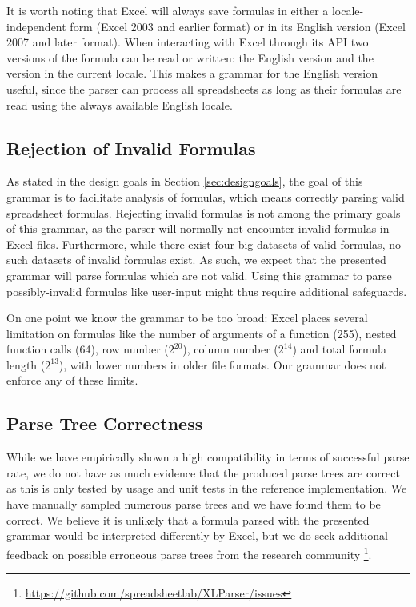 \documentclass[times]{smrauth}
\begin{document}
It is worth noting that Excel will always save formulas in either a locale-independent form (Excel 2003 and earlier format) or in its English version (Excel 2007 and later format). When interacting with Excel through its API two versions of the formula can be read or written: the English version and the version in the current locale.
This makes a grammar for the English version useful, since the parser can process all spreadsheets as long as their formulas are read using the always available English locale.

\subsection{Rejection of Invalid Formulas}

As stated in the design goals in Section \ref{sec:designgoals}, the goal of this grammar is to facilitate analysis of formulas, which means correctly parsing valid spreadsheet formulas.
Rejecting invalid formulas is not among the primary goals of this grammar, as the parser will normally not encounter invalid formulas in Excel files.
Furthermore, while there exist four big datasets of valid formulas, no such datasets of invalid formulas exist.
As such, we expect that the presented grammar will parse formulas which are not valid.
Using this grammar to parse possibly-invalid formulas like user-input might thus require additional safeguards.

On one point we know the grammar to be too broad: Excel places several limitation on formulas like the number of arguments of a function (255), nested function calls (64), row number ($2^{20}$), column number ($2^{14}$) and total formula length ($2^{13}$), with lower numbers in older file formats.
Our grammar does not enforce any of these limits.

\subsection{Parse Tree Correctness}

While we have empirically shown a high compatibility in terms of successful parse rate, we do not have as much evidence that the produced parse trees are correct as this is only tested by usage and unit tests in the reference implementation. We have manually sampled numerous parse trees and we have found them to be correct. We believe it is unlikely that a formula parsed with the presented grammar would be interpreted differently by Excel, but we do seek additional feedback on possible erroneous parse trees from the research community \footnote{\url{https://github.com/spreadsheetlab/XLParser/issues}}.
\end{document}
